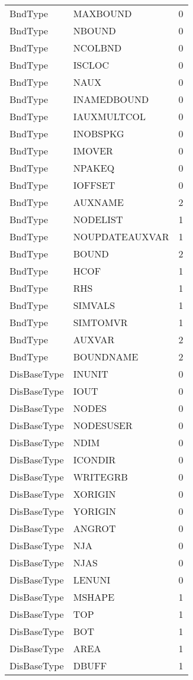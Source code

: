 \begin{longtable}{p{6cm} p{4cm} p{2cm} }
BndType &  MAXBOUND & 0 \\ 
BndType &  NBOUND & 0 \\ 
BndType &  NCOLBND & 0 \\ 
BndType &  ISCLOC & 0 \\ 
BndType &  NAUX & 0 \\ 
BndType &  INAMEDBOUND & 0 \\ 
BndType &  IAUXMULTCOL & 0 \\ 
BndType &  INOBSPKG & 0 \\ 
BndType &  IMOVER & 0 \\ 
BndType &  NPAKEQ & 0 \\ 
BndType &  IOFFSET & 0 \\ 
BndType &  AUXNAME & 2 \\ 
BndType &  NODELIST & 1 \\ 
BndType &  NOUPDATEAUXVAR & 1 \\ 
BndType &  BOUND & 2 \\ 
BndType &  HCOF & 1 \\ 
BndType &  RHS & 1 \\ 
BndType &  SIMVALS & 1 \\ 
BndType &  SIMTOMVR & 1 \\ 
BndType &  AUXVAR & 2 \\ 
BndType & BOUNDNAME & 2 \\ 
DisBaseType &  INUNIT & 0 \\ 
DisBaseType &  IOUT & 0 \\ 
DisBaseType &  NODES & 0 \\ 
DisBaseType &  NODESUSER & 0 \\ 
DisBaseType &  NDIM & 0 \\ 
DisBaseType &  ICONDIR & 0 \\ 
DisBaseType &  WRITEGRB & 0 \\ 
DisBaseType &  XORIGIN & 0 \\ 
DisBaseType &  YORIGIN & 0 \\ 
DisBaseType &  ANGROT & 0 \\ 
DisBaseType &  NJA & 0 \\ 
DisBaseType &  NJAS & 0 \\ 
DisBaseType &  LENUNI & 0 \\ 
DisBaseType &  MSHAPE & 1 \\ 
DisBaseType &  TOP & 1 \\ 
DisBaseType &  BOT & 1 \\ 
DisBaseType &  AREA & 1 \\ 
DisBaseType &  DBUFF & 1 \\ 

\end{longtable}
